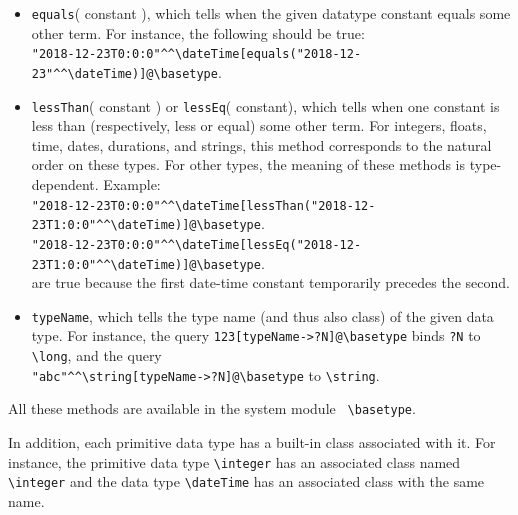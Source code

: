 \documentclass[11pt]{article}
\newcommand{\ERGO}{\mbox{\smaller{\ensuremath{\cal{E}}\smaller{{\sc{RGO}}}}}\xspace}
\newcommand{\FLSYSTEM}{\ERGO}
\newcommand{\bs}{\textbackslash}
\begin{document}
\begin{itemize}
      For instance,\\
      \verb|?T[isTypeOf("12:13:44"^^\time)]@\basetype| will bind
      \texttt{?T} to \texttt{\bs{}time} and  
      \\
      \verb|?T[isTypeOf(123)]@\basetype| will bind \texttt{?T} to
      \texttt{\bs{}long}. 
    \item {\tt equals}( constant ), which tells when the given datatype constant equals some other term.
      For instance, the following should be true:
      \\
      \verb|"2018-12-23T0:0:0"^^\dateTime[equals("2018-12-23"^^\dateTime)]@\basetype|.
    \item {\tt lessThan}( constant ) or \texttt{lessEq}( constant), which tells when one constant is
      less than (respectively, less or equal)
      some other term. For integers, floats, time, dates,
      durations, and strings, this method corresponds to the natural order
      on these types. For other types, the meaning of these methods is type-dependent.
      Example:
      \\
      {\small
      \verb|"2018-12-23T0:0:0"^^\dateTime[lessThan("2018-12-23T1:0:0"^^\dateTime)]@\basetype|.
      \\
      \verb|"2018-12-23T0:0:0"^^\dateTime[lessEq("2018-12-23T1:0:0"^^\dateTime)]@\basetype|.
      }
      \\
      are true because the first date-time constant temporarily precedes
      the second.

    \item {\tt typeName}, which tells the type name (and thus also class)
      of the given data type.
      For instance, the query \verb|123[typeName->?N]@\basetype| binds \texttt{?N} to
      \texttt{\bs{}long}, and the query\\
      \verb|"abc"^^\string[typeName->?N]@\basetype|
      to \texttt{\bs{}string}.   
    \end{itemize}

    \noindent
    All these methods are available in the \FLSYSTEM system module {\tt
      \bs{}basetype}. 

In addition, each primitive data type has a built-in class associated with it.
For instance, the primitive data type {\tt \bs{}integer} has an associated
class  named {\tt \bs{}integer} and the data type {\tt \bs{}dateTime} has an
associated class with the same name.  
\end{document}
